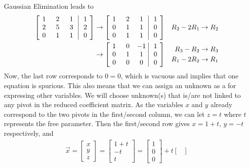 \begin{solution} 
Gaussian Elimination leads to
\begin{align*}
\left[\begin{array}{@{\,}wc{10pt}wc{10pt}wc{10pt}|wc{10pt}@{\,}}
1 & 2 & 1 & 1 \\
2 & 5 & 3 & 2 \\
0 & 1 & 1 & 0
\end{array}\right] 
& \to 
\left[\begin{array}{@{\,}wc{10pt}wc{10pt}wc{10pt}|wc{10pt}@{\,}}
1 & 2 & 1 & 1 \\
0 & 1 & 1 & 0 \\
0 & 1 & 1 & 0
\end{array}\right] 
& R_2 - 2R_1 \to R_2 \\
& \to 
\left[\begin{array}{@{\,}wc{10pt}wc{10pt}wc{10pt}|wc{10pt}@{\,}}
1 & 0 & -1 & 1 \\
0 & 1 & 1 & 0 \\
0 & 0 & 0 & 0
\end{array}\right] 
& \begin{aligned}
R_3-R_2 &\to R_3 \\
R_1-2R_2 &\to R_1    
\end{aligned}
\end{align*}
Now, the last row corresponds to $0 = 0$, which is vacuous and implies that one equation is spurious. This also means that we can assign an unknown as a  for expressing other variables. We will choose unknown(s) that is/are not linked to any pivot in the reduced coefficient matrix. As the variables $x$ and $y$ already correspond to the two pivots in the first/second column, we can let $z = t$ where $t$ represents the free parameter. Then the first/second row gives $x = 1+t$, $y = -t$ respectively, and
\begin{align*}
\vec{x} = 
\begin{bmatrix}
x \\
y \\
z
\end{bmatrix}
=
\begin{bmatrix}
1+t \\
-t \\
t
\end{bmatrix}
=
\begin{bmatrix}
1 \\
0 \\
0
\end{bmatrix}
+ t
\begin{bmatrix}

\end{bmatrix}
\end{align*}
\end{solution}
